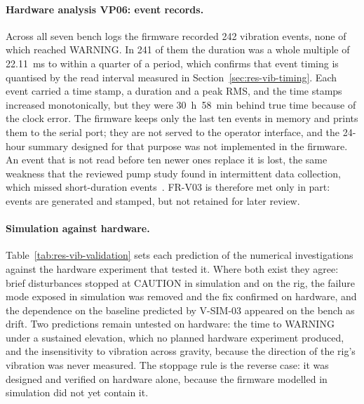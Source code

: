 \paragraph{Hardware analysis VP06: event records.}
Across all seven bench logs the firmware recorded 242 vibration events, none of which reached
WARNING. In 241 of them the duration was a whole multiple of 22.11~ms to within a quarter of a period,
which confirms that event timing is quantised by the read interval measured in
Section~\ref{sec:res-vib-timing}. Each event carried a time stamp, a duration and a peak RMS, and the
time stamps increased monotonically, but they were 30~h~58~min behind true time because of the clock
error. The firmware keeps only the last ten events in memory and prints them to the serial port; they
are not served to the operator interface, and the 24-hour summary designed for that purpose was not
implemented in the firmware. An event that is not read before ten newer ones replace it is lost, the
same weakness that the reviewed pump study found in intermittent data collection, which missed
short-duration events~\cite{chen2024}. FR-V03 is therefore met only in part: events are generated and
stamped, but not retained for later review.

\paragraph{Simulation against hardware.}
Table~\ref{tab:res-vib-validation} sets each prediction of the numerical investigations against the
hardware experiment that tested it. Where both exist they agree: brief disturbances stopped at CAUTION
in simulation and on the rig, the failure mode exposed in simulation was removed and the fix confirmed
on hardware, and the dependence on the baseline predicted by V-SIM-03 appeared on the bench as drift.
Two predictions remain untested on hardware: the time to WARNING under a sustained elevation, which no
planned hardware experiment produced, and the insensitivity to vibration across gravity, because the
direction of the rig's vibration was never measured. The stoppage rule is the reverse case: it was
designed and verified on hardware alone, because the firmware modelled in simulation did not yet
contain it.

